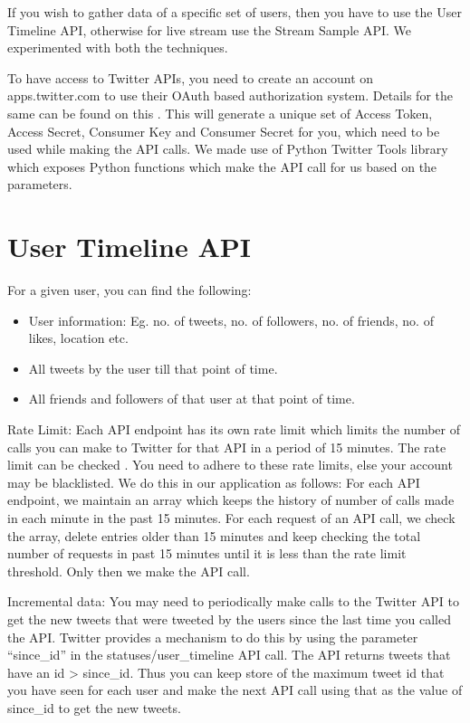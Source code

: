 \documentclass[letterpaper,10pt,english]{sphinxmanual}
\begin{document}
If you wish to gather data of a specific set of users, then you have to use the User Timeline API, otherwise for live stream use the Stream Sample API. We experimented with both the techniques.

To have access to Twitter APIs, you need to create an account on apps.twitter.com to use their OAuth based authorization system. Details for the same can be found on this . This will generate a unique set of Access Token, Access Secret, Consumer Key and Consumer Secret for you, which need to be used while making the API calls. We made use of Python Twitter Tools library which exposes Python functions which make the API call for us based on the parameters.


\section{User Timeline API}
\label{\detokenize{twitter_stream:user-timeline-api}}
For a given user, you can find the following:
\begin{itemize}
\item {} 
User information: Eg. no. of tweets, no. of followers, no. of friends, no. of likes, location etc.

\item {} 
All tweets by the user till that point of time.

\item {} 
All friends and followers of that user at that point of time.

\end{itemize}

Rate Limit: Each API endpoint has its own rate limit which limits the number of calls you can make to Twitter for that API in a period of 15 minutes. The rate limit can be checked . You need to adhere to these rate limits, else your account may be blacklisted. We do this in our application as follows: For each API endpoint, we maintain an array which keeps the history of number of calls made in each minute in the past 15 minutes. For each request of an API call, we check the array, delete entries older than 15 minutes and keep checking the total number of requests in past 15 minutes until it is less than the rate limit threshold. Only then we make the API call.

Incremental data: You may need to periodically make calls to the Twitter API to get the new tweets that were tweeted by the users since the last time you called the API. Twitter provides a mechanism to do this by using the parameter “since\_id” in the statuses/user\_timeline API call. The API returns tweets that have an id \textgreater{} since\_id. Thus you can keep store of the maximum tweet id that you have seen for each user and make the next API call using that as the value of since\_id to get the new tweets.
\end{document}
